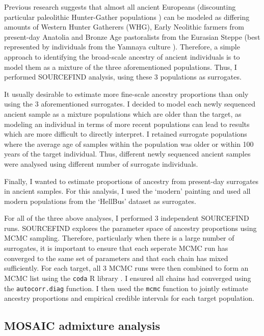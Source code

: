 Previous research suggests that almost all ancient Europeans (discounting particular paleolithic Hunter-Gather populations \cite{Fu2016}) can be modeled as differing amounts of Western Hunter Gatherers (WHG), Early Neolithic farmers from present-day Anatolia and Bronze Age pastoralists from the Eurasian Steppe (best represented by individuals from the Yamnaya culture \cite{Lazaridis2014}). Therefore, a simple approach to identifying the broad-scale ancestry of ancient individuals is to model them as a mixture of the three aforementioned populations. Thus, I performed SOURCEFIND analysis, using these 3 populations as surrogates.

It usually desirable to estimate more fine-scale ancestry proportions than only using the 3 aforementioned surrogates. I decided to model each newly sequenced ancient sample as a mixture populations which are older than the target, as modeling an individual in terms of more recent populations can lead to results which are more difficult to directly interpret. I retained surrogate populations where the average age of samples within the population was older or within 100 years of the target individual. Thus, different newly sequenced ancient samples were analysed using different number of surrogate individuals. 

Finally, I wanted to estimate proportions of ancestry from present-day surrogates in ancient samples. For this analysis, I used the `modern' painting and used all modern populations from the `HellBus' dataset as surrogates. 

For all of the three above analyses, I performed 3 independent SOURCEFIND runs. SOURCEFIND explores the parameter space of ancestry proportions using MCMC sampling. Therefore, particularly when there is a large number of surrogates, it is important to ensure that each seperate MCMC run has converged to the same set of parameters and that each chain has mixed sufficiently. For each target, all 3 MCMC runs were then combined to form an MCMC list using the \texttt{coda} R library \cite{oro22547}. I ensured all chains had converged using the  \texttt{autocorr.diag} function. I then used the \texttt{mcmc} function to jointly estimate ancestry proportions and empirical credible intervals for each target population. 

\subsection{MOSAIC admixture analysis}

